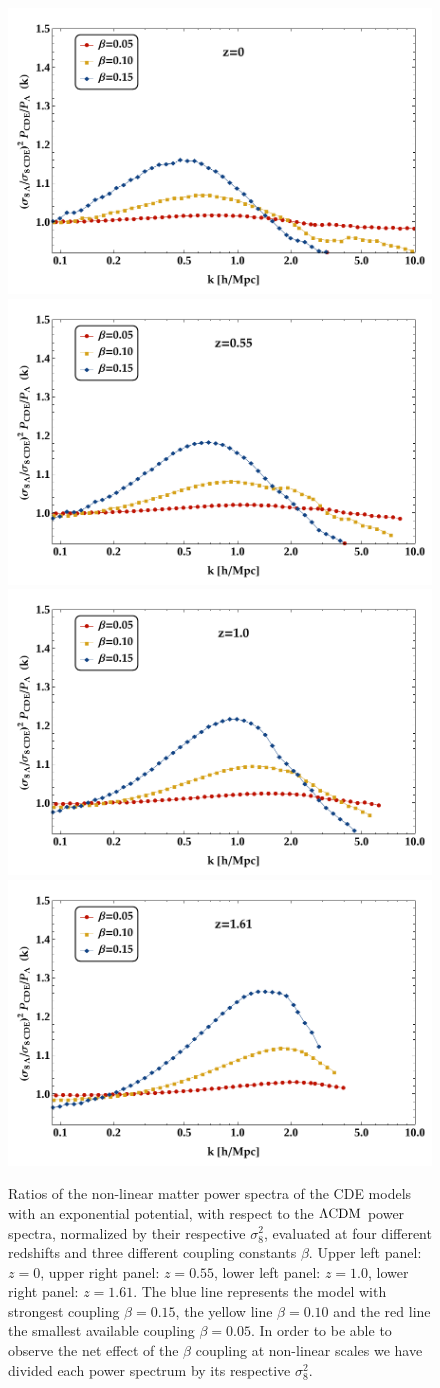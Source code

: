 \begin{figure}
\begin{centering}
\includegraphics[width=0.44\columnwidth]{Chapters/fitting-funcs/figures/ratioPk-z000}
\includegraphics[width=0.44\columnwidth]{Chapters/fitting-funcs/figures/ratioPk-z055}\\
\includegraphics[width=0.44\columnwidth]{Chapters/fitting-funcs/figures/ratioPk-z100}
\includegraphics[width=0.44\columnwidth]{Chapters/fitting-funcs/figures/ratioPk-z161} 
\par\end{centering}
\caption[Ratios to $\lcdm$ of the non-linear matter power spectra in the  simulations]
{Ratios of the non-linear matter power spectra of the 
CDE models with an exponential potential, with respect to the 
$\protect\Lambda\mathrm{CDM}$ power spectra, normalized by their respective $\sigma_{8}^{2}$,
evaluated at four different redshifts and three different coupling
constants $\beta$. Upper left panel: $z=0$, upper right panel: $z=0.55$,
lower left panel: $z=1.0$, lower right panel: $z=1.61$. The blue
line represents the model with strongest coupling \textbf{$\beta=0.15$},
the yellow line $\beta=0.10$ and the red line the smallest available
coupling $\beta=0.05$. In order to be able to observe the net effect
of the $\beta$ coupling at non-linear scales we have divided each
power spectrum by its respective $\sigma_{8}^{2}$.}
\label{fig:Ratio-of-CoDECS} 
\end{figure}

